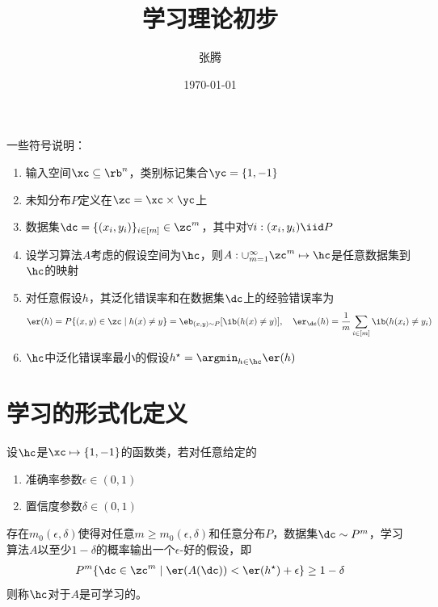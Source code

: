 \documentclass{ctexart}
\begin{document}
\title{\textbf{学习理论初步}}
\author{张腾}
\date{\today}
\maketitle

一些符号说明：

\begin{enumerate}
    \item 输入空间$\xc \subseteq \rb^n$，类别标记集合$\yc = \{ 1, -1\}$
    \item 未知分布$P$定义在$\zc = \xc \times \yc$上
    \item 数据集$\dc = \{ (x_i, y_i) \}_{i \in [m]} \in \zc^m$，其中对$\forall i: (x_i, y_i) \iid P$
    \item 设学习算法$A$考虑的假设空间为$\hc$，则$A: \cup_{m=1}^\infty \zc^m \mapsto \hc$是任意数据集到$\hc$的映射
    \item 对任意假设$h$，其泛化错误率和在数据集$\dc$上的经验错误率为
          \begin{align*}
              \er (h) = P \{ (x, y) \in \zc \mid h(x) \ne y \} = \eb_{(x, y) \sim P} [\ib(h(x) \ne y)], \quad \er_\dc (h) = \frac{1}{m} \sum_{i \in [m]} \ib(h(x_i) \ne y_i)
          \end{align*}
    \item $\hc$中泛化错误率最小的假设$h^\star = \argmin_{h \in \hc} \er(h)$
\end{enumerate}

\section{学习的形式化定义}

\begin{definition} [可学习]
    设$\hc$是$\xc \mapsto \{ 1, -1\}$的函数类，若对任意给定的
    \begin{enumerate}
        \item 准确率参数$\epsilon \in (0,1)$
        \item 置信度参数$\delta \in (0,1)$
    \end{enumerate}
    存在$m_0 (\epsilon, \delta)$使得对任意$m \ge m_0 (\epsilon, \delta)$和任意分布$P$，数据集$\dc \sim P^m$，学习算法$A$以至少$1 - \delta$的概率输出一个$\epsilon$-好的假设，即
    \begin{align*}
        P^m \{ \dc \in \zc^m \mid \er(A(\dc)) < \er(h^\star) + \epsilon \} \ge 1 - \delta
    \end{align*}
    则称$\hc$对于$A$是可学习的。
\end{definition}
\end{document}
